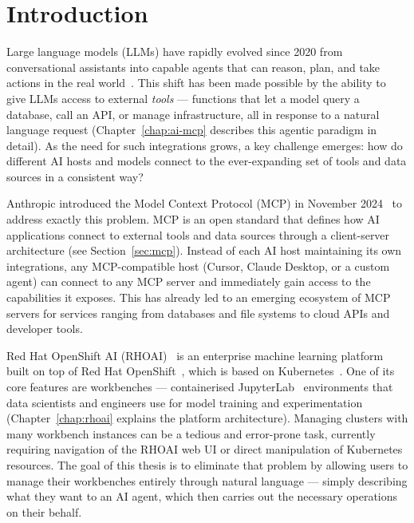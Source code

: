 \documentclass[
  digital,     %
  oneside,     %
  nosansbold,  %
  nocolorbold, %
  lof,         %
  lot,         %
]{fithesis4}
\begin{document}
\chapter{Introduction}
\label{chap:introduction}

Large language models (LLMs) have rapidly evolved since 2020 from
conversational assistants into capable agents that can reason, plan, and take
actions in the real world~\parencite{brown2020gpt3,yao2022react}. This shift
has been made possible by the ability to give LLMs access to external
\textit{tools} --- functions that let a model query a database, call an API,
or manage infrastructure, all in response to a natural language request
(Chapter~\ref{chap:ai-mcp} describes this agentic paradigm in detail). As
the need for such integrations grows, a key challenge emerges: how do
different AI hosts and models connect to the ever-expanding set of tools and
data sources in a consistent way?

Anthropic introduced the Model Context Protocol (MCP) in November
2024~\parencite{mcp-announcement} to address exactly this problem. MCP is
an open standard that defines how AI applications connect to external tools
and data sources through a client-server architecture (see
Section~\ref{sec:mcp}). Instead of each AI host maintaining its own
integrations, any MCP-compatible host (Cursor, Claude Desktop, or a custom
agent) can connect to any MCP server and immediately gain access to the
capabilities it exposes. This has already led to an emerging ecosystem of MCP
servers for services ranging from databases and file systems to cloud APIs
and developer tools.

Red Hat OpenShift AI (RHOAI)~\parencite{rhoai-docs} is an enterprise machine
learning platform built on top of Red Hat
OpenShift~\parencite{openshift}, which is based on
Kubernetes~\parencite{kubernetes-docs}. One of its core features are
workbenches --- containerised JupyterLab~\parencite{jupyterlab} environments
that data scientists and engineers use for model training and experimentation
(Chapter~\ref{chap:rhoai} explains the platform architecture). Managing
clusters with many workbench instances can be a tedious and error-prone task,
currently requiring navigation of the RHOAI web UI or direct manipulation of
Kubernetes resources. The goal of this thesis is to eliminate that problem by
allowing users to manage their workbenches entirely through natural language
--- simply describing what they want to an AI agent, which then carries out
the necessary operations on their behalf.
\end{document}
